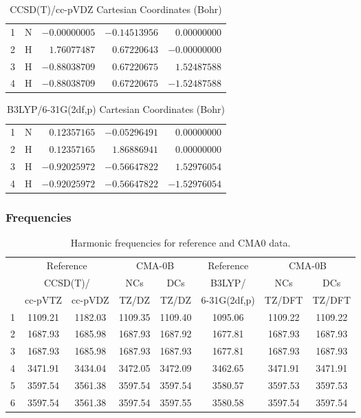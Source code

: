 \documentclass[10pt,oneside]{article}
\begin{document}
\begin{table}[h!]
\centering
\caption{CCSD(T)/cc-pVDZ Cartesian Coordinates (Bohr)}
\begin{tabular}{llrrr}
1  & N  & $-0.00000005$ & $-0.14513956$ & $ 0.00000000$ \\
2  & H  & $ 1.76077487$ & $ 0.67220643$ & $-0.00000000$ \\
3  & H  & $-0.88038709$ & $ 0.67220675$ & $ 1.52487588$ \\
4  & H  & $-0.88038709$ & $ 0.67220675$ & $-1.52487588$ \\
\end{tabular}
\end{table}

\begin{table}[h!]
\centering
\caption{B3LYP/6-31G(2df,p) Cartesian Coordinates (Bohr)}
\begin{tabular}{llrrr}
1  & N  & $ 0.12357165$ & $-0.05296491$ & $ 0.00000000$ \\
2  & H  & $ 0.12357165$ & $ 1.86886941$ & $ 0.00000000$ \\
3  & H  & $-0.92025972$ & $-0.56647822$ & $ 1.52976054$ \\
4  & H  & $-0.92025972$ & $-0.56647822$ & $-1.52976054$ \\
\end{tabular}
\end{table}

\clearpage

\subsubsection*{Frequencies}
\begin{table}[h!]
\centering
\caption{Harmonic frequencies for reference and CMA0 data.}
\begin{tabular}{cccccccc}
\toprule
{} & \multicolumn{2}{c}{Reference} & \multicolumn{2}{c}{CMA-0B} &    Reference & \multicolumn{2}{c}{CMA-0B} \\
{} & \multicolumn{2}{c}{CCSD(T)/} &     NCs &     DCs &       B3LYP/ &     NCs &     DCs \\
{} &   cc-pVTZ & cc-pVDZ &   TZ/DZ &   TZ/DZ & 6-31G(2df,p) &  TZ/DFT &  TZ/DFT \\
\midrule
1 &   1109.21 & 1182.03 & 1109.35 & 1109.40 &      1095.06 & 1109.22 & 1109.22 \\
2 &   1687.93 & 1685.98 & 1687.93 & 1687.92 &      1677.81 & 1687.93 & 1687.93 \\
3 &   1687.93 & 1685.98 & 1687.93 & 1687.93 &      1677.81 & 1687.93 & 1687.93 \\
4 &   3471.91 & 3434.04 & 3472.05 & 3472.09 &      3462.65 & 3471.91 & 3471.91 \\
5 &   3597.54 & 3561.38 & 3597.54 & 3597.54 &      3580.57 & 3597.53 & 3597.53 \\
6 &   3597.54 & 3561.38 & 3597.54 & 3597.55 &      3580.58 & 3597.54 & 3597.54 \\
\bottomrule
\end{tabular}
\end{table}
\end{document}
